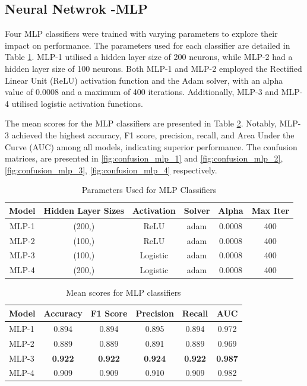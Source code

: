 \subsection*{Neural Netwrok -MLP}
Four MLP classifiers were trained with varying parameters to explore their impact on performance. The parameters used for each classifier are detailed in Table \ref{tab:mlp_params}. MLP-1 utilised a hidden layer size of 200 neurons, while MLP-2 had a hidden layer size of 100 neurons. Both MLP-1 and MLP-2 employed the Rectified Linear Unit (ReLU) activation function and the Adam solver, with an alpha value of 0.0008 and a maximum of 400 iterations. Additionally, MLP-3 and MLP-4 utilised logistic activation functions.

The mean scores for the MLP classifiers are presented in Table \ref{tab:mlp_scores}. Notably, MLP-3 achieved the highest accuracy, F1 score, precision, recall, and Area Under the Curve (AUC) among all models, indicating superior performance. The confusion matrices, are presented in \autoref{fig:confusion_mlp_1} and \autoref{fig:confusion_mlp_2}, \autoref{fig:confusion_mlp_3}, \autoref{fig:confusion_mlp_4} respectively.

\begin{table}[H]
    \centering
    \begin{tabular}{|c|c|c|c|c|c|}
    \hline
    \textbf{Model} & \textbf{Hidden Layer Sizes} & \textbf{Activation} & \textbf{Solver} & \textbf{Alpha} & \textbf{Max Iter}  \\
    \hline
    MLP-1 & (200,) & ReLU & adam & 0.0008 & 400  \\
    MLP-2 & (100,) & ReLU & adam & 0.0008 & 400  \\
    MLP-3 & (100,) & Logistic & adam & 0.0008 & 400  \\
    MLP-4 & (200,) & Logistic & adam & 0.0008 & 400  \\
    \hline
    \end{tabular}
    \caption{Parameters Used for MLP Classifiers}
    \label{tab:mlp_params}
    \end{table}
    
    \begin{table}[H]
    \centering
    \begin{tabular}{|l|c|c|c|c|c|}
    \hline
    \textbf{Model} & \textbf{Accuracy} & \textbf{F1 Score} & \textbf{Precision} & \textbf{Recall} & \textbf{AUC} \\
    \hline
    MLP-1 & 0.894 & 0.894 & 0.895 & 0.894 & 0.972 \\
    MLP-2 & 0.889 & 0.889 & 0.891 & 0.889 & 0.969 \\
    MLP-3 & \textbf{0.922} & \textbf{0.922} & \textbf{0.924} & \textbf{0.922} & \textbf{0.987} \\
    MLP-4 & 0.909 & 0.909 & 0.910 & 0.909 & 0.982 \\
    
    \hline
    \end{tabular}
    \caption{Mean scores for MLP classifiers}
    \label{tab:mlp_scores}
    \end{table}
    
